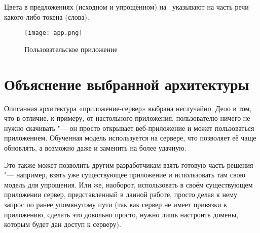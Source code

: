 Цвета в предложениях (исходном и упрощённом) на~ указывают на часть речи какого-либо токена (слова).

\begin{figure}[H]%
  \centering
  \texttt{[image: app.png]}
  \caption{Пользовательское приложение}
  \label{app-screen}
\end{figure}


\section{Объяснение выбранной архитектуры}


Описанная архитектура «приложение-сервер» выбрана неслучайно. Дело в том, что в отличие, к примеру, от настольного приложения, пользователю ничего не нужно скачивать "--- он просто открывает веб-приложение и может пользоваться приложением. Обученная модель используется на сервере, что позволяет её чаще обновлять, а возможно даже и заменить на более удачную.

Это также может позволить другим разработчикам взять готовую часть решения "--- например, взять уже существующее приложение и использовать там свою модель для упрощения. Или же, наоборот, использовать в своём существующем приложении сервер, представленный в данной работе, просто делая к нему запрос по ранее упомянутому пути (так как сервер не имеет привязки к приложению, сделать это довольно просто, нужно лишь настроить домены, которым будет дан доступ к серверу).
